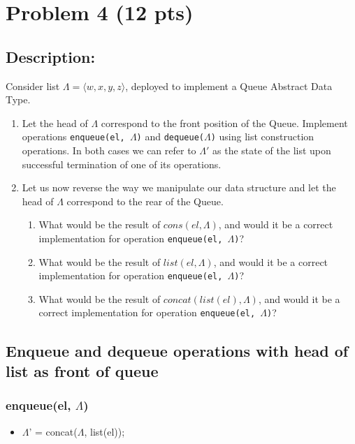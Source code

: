 \newpage

\section{Problem 4 (12 pts)}

\subsection{Description:}

Consider list $\Lambda = \langle w, x, y, z \rangle$, deployed to implement a Queue Abstract Data Type.

\begin{enumerate}

\item Let the head of $\Lambda$ correspond to the front position of the Queue. Implement operations \texttt{enqueue(el, $\Lambda$)} and \texttt{dequeue($\Lambda$)} using list construction operations. In both cases we can refer to $\Lambda'$ as the state of the list upon successful termination of one of its operations.

\item Let us now reverse the way we manipulate our data structure and let the head of $\Lambda$ correspond to the rear of the Queue.
\begin{enumerate}
\item What would be the result of $cons(el, \Lambda)$, and would it be a correct implementation for operation \texttt{enqueue(el, $\Lambda$)}?
\item What would be the result of $list(el, \Lambda)$, and would it be a correct implementation for operation \texttt{enqueue(el, $\Lambda$)}?
\item What would be the result of $concat(list(el), \Lambda)$, and would it be a correct implementation for operation \texttt{enqueue(el, $\Lambda$)}?
\end{enumerate}
\end{enumerate}


\subsection{Enqueue and dequeue operations with head of list as front of queue}

\subsubsection{enqueue(el, $\Lambda$)}
\begin{itemize}
    \item[] $\Lambda$' = concat($\Lambda$, list(el));
\end{itemize}

